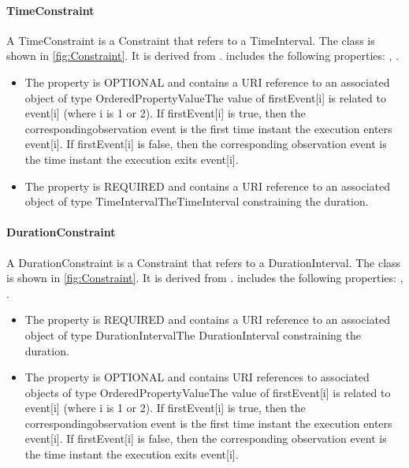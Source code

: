 \paragraph{TimeConstraint}%
\label{sec:uml:TimeConstraint}%
A TimeConstraint is a Constraint that refers to a TimeInterval.%
\linebreak%
\linebreak%
The  class is shown in \ref{fig:Constraint}. It is derived from .%
 includes the following properties: , . %
\begin{itemize}%
\item%
The  property is OPTIONAL and contains a URI reference to an associated object of type OrderedPropertyValueThe value of firstEvent[i] is related to event[i] (where i is 1 or 2). If firstEvent[i] is true, then the correspondingobservation event is the first time instant the execution enters event[i]. If firstEvent[i] is false, then the corresponding observation event is the time instant the execution exits event[i].%
\item%
The  property is REQUIRED and contains a URI reference to an associated object of type TimeIntervalTheTimeInterval constraining the duration.%
\end{itemize}%
\paragraph{DurationConstraint}%
\label{sec:uml:DurationConstraint}%
A DurationConstraint is a Constraint that refers to a DurationInterval.%
\linebreak%
\linebreak%
The  class is shown in \ref{fig:Constraint}. It is derived from .%
 includes the following properties: , . %
\begin{itemize}%
\item%
The  property is REQUIRED and contains a URI reference to an associated object of type DurationIntervalThe DurationInterval constraining the duration.%
\item%
The  property is OPTIONAL and contains URI references to associated objects of type OrderedPropertyValueThe value of firstEvent[i] is related to event[i] (where i is 1 or 2). If firstEvent[i] is true, then the correspondingobservation event is the first time instant the execution enters event[i]. If firstEvent[i] is false, then the corresponding observation event is the time instant the execution exits event[i].%
\end{itemize}%
